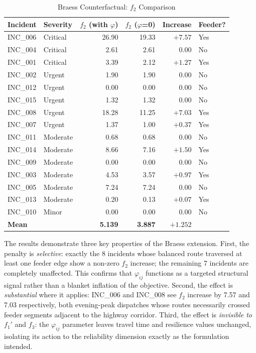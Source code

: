 \documentclass[paper=A4, 12pt, mathscr]{report}
\begin{document}
	\begin{table}[H]
		\centering
		\caption{Braess Counterfactual: $f_2$ Comparison}
		\label{tab:braess}
		\small
		\begin{tabular}{llrrrl}
			\hline
			\textbf{Incident} & \textbf{Severity}
			& $f_2$ \textbf{(with $\varphi$)}
			& $f_2$ \textbf{($\varphi$=0)}
			& \textbf{Increase}
			& \textbf{Feeder?} \\
			\hline
			INC\_006 & Critical  & 26.90 & 19.33 & $+7.57$ & Yes \\
			INC\_004 & Critical  &  2.61 &  2.61 &  0.00   & No  \\
			INC\_001 & Critical  &  3.39 &  2.12 & $+1.27$ & Yes \\
			INC\_002 & Urgent    &  1.90 &  1.90 &  0.00   & No  \\
			INC\_012 & Urgent    &  0.00 &  0.00 &  0.00   & No  \\
			INC\_015 & Urgent    &  1.32 &  1.32 &  0.00   & No  \\
			INC\_008 & Urgent    & 18.28 & 11.25 & $+7.03$ & Yes \\
			INC\_007 & Urgent    &  1.37 &  1.00 & $+0.37$ & Yes \\
			INC\_011 & Moderate  &  0.68 &  0.68 &  0.00   & No  \\
			INC\_014 & Moderate  &  8.66 &  7.16 & $+1.50$ & Yes \\
			INC\_009 & Moderate  &  0.00 &  0.00 &  0.00   & No  \\
			INC\_003 & Moderate  &  4.53 &  3.57 & $+0.97$ & Yes \\
			INC\_005 & Moderate  &  7.24 &  7.24 &  0.00   & No  \\
			INC\_013 & Moderate  &  0.20 &  0.13 & $+0.07$ & Yes \\
			INC\_010 & Minor     &  0.00 &  0.00 &  0.00   & No  \\
			\hline
			\textbf{Mean} & & \textbf{5.139} & \textbf{3.887}
			& $\mathbf{+1.252}$ & \\
			\hline
		\end{tabular}
	\end{table}
	
	The results demonstrate three key properties of the Braess extension.
	First, the penalty is \textit{selective}: exactly the 8 incidents whose
	balanced route traversed at least one feeder edge show a non-zero
	$f_2$ increase; the remaining 7 incidents are completely unaffected. This
	confirms that $\varphi_{ij}$ functions as a targeted structural signal
	rather than a blanket inflation of the objective. Second, the effect is
	\textit{substantial} where it applies: INC\_006 and INC\_008 see $f_2$
	increase by 7.57 and 7.03 respectively, both evening-peak dispatches
	whose routes necessarily crossed feeder segments adjacent to the highway
	corridor. Third, the effect is \textit{invisible to} $f_1'$ and $f_3$:
	the $\varphi_{ij}$ parameter leaves travel time and resilience values
	unchanged, isolating its action to the reliability dimension exactly as
	the formulation intended.
	
\end{document}
